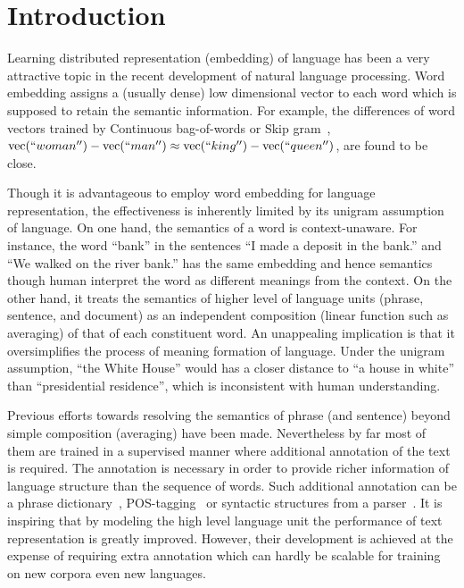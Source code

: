 \section{Introduction}

Learning distributed representation (embedding) of language has been a very
attractive topic in the recent development of natural language processing. Word
embedding assigns a (usually dense) low dimensional vector to each word which is
supposed to retain the semantic information. For example, the differences of
word vectors trained by Continuous bag-of-words or Skip
gram~\cite{mikolov2013distributed}, $\text{vec}(``woman'') - \text{vec}(``man'')
\approx \text{vec}(``king'') - \text{vec}(``queen'')$, are found to be close.

Though it is advantageous to employ word embedding for language representation,
the effectiveness is inherently limited by its unigram assumption of language.
On one hand, the semantics of a word is context-unaware. For instance, the word
``bank'' in the sentences ``I made a deposit in the bank.'' and ``We walked on
the river bank.'' has the same embedding and hence semantics though human
interpret the word as different meanings from the context. On the other hand, it
treats the semantics of higher level of language units (phrase, sentence, and
document) as an independent composition (linear function such as averaging) of
that of each constituent word. An unappealing implication is that it
oversimplifies the process of meaning formation of language. Under the unigram
assumption, ``the White House'' would has a closer distance to ``a house in
white'' than ``presidential residence'', which is inconsistent with human
understanding.

Previous efforts towards resolving the semantics of phrase (and sentence) beyond
simple composition (averaging) have been made. Nevertheless by far most of them
are trained in a supervised manner where additional annotation of the text is
required. The annotation is necessary in order to provide richer information of
language structure than the sequence of words. Such additional annotation can be
a phrase dictionary~\cite{yin2014exploration},
POS-tagging~\cite{zhao2015phrase,baroni2010nouns} or syntactic structures from a
parser~\cite{levy2014dependency,yu2015learning,socher2013parsing,
le2015compositional,irsoy2014deep}. It is inspiring that by modeling the high
level language unit the performance of text representation is greatly improved.
However, their development is achieved at the expense of requiring extra
annotation which can hardly be scalable for training on new corpora even new
languages.

